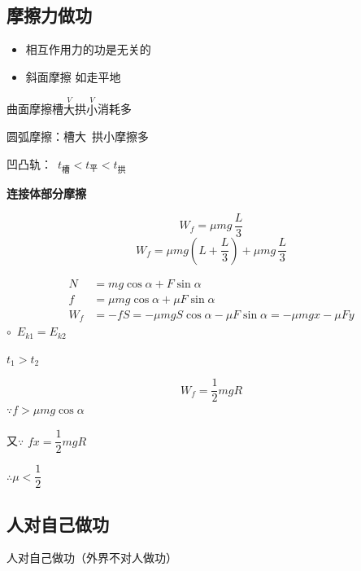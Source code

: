 \subsection{摩擦力做功}
\begin{itemize}
\item 相互作用力的功是无关的
\item 斜面摩擦 如走平地
\end{itemize}
\begin{keybox}
曲面摩擦\quad 槽$\overset{V}{\text{大}}$拱$\overset{V}{\text{小}}$消耗多
\end{keybox}

圆弧摩擦：槽大\ 拱小\quad 摩擦多

凹凸轨：\ $t_{\text{槽}}<t_{\text{平}}<t_{\text{拱}}$


\textbf{连接体部分摩擦}

\[
W_f=\mu mg\,\frac L3
\]
\[
W_f=\mu mg\left(L+\frac L3\right)+\mu mg\,\frac L3
\]

\begin{align*}
N&=mg\cos\alpha+F\sin\alpha\\
f&=\mu mg\cos\alpha+\mu F\sin\alpha\\
W_f&=-fS=-\mu mgS\cos\alpha-\mu F\sin\alpha=-\mu mgx-\mu Fy %
\end{align*}
$\circ$\ $E_{k1}=E_{k2}$ %

\quad $t_1>t_2$


\[
W_f=\frac{1}{2}mgR
\]
$\because f>\mu mg\cos\alpha$

又$\because$ $fx=\dfrac{1}{2}mgR$

$\therefore \mu<\dfrac{1}{2}$

\subsection{人对自己做功}
人对自己做功（外界不对人做功）

